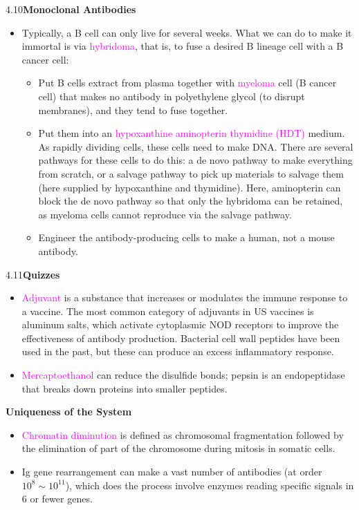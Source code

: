 \documentclass[UTF8]{book}
\newcommand{\pink}[1]{\textcolor{magenta}{#1}}
\begin{document}
4.10\quad \textbf{Monoclonal Antibodies}
\begin{itemize}
\item Typically, a B cell can only live for several weeks. What we can do to make it immortal is via \pink{hybridoma}, that is, to fuse a desired B lineage cell with a B cancer cell:
\begin{itemize}
	\item Put B cells extract from plasma together with \pink{myeloma} cell (B cancer cell) that makes no antibody in polyethylene glycol (to disrupt membranes), and they tend to fuse together.
	\item Put them into an \pink{hypoxanthine aminopterin thymidine (HDT)} medium. As rapidly dividing cells, these cells need to make DNA. There are several pathways for these cells to do this: a de novo pathway to make everything from scratch, or a salvage pathway to pick up materials to salvage them (here supplied by hypoxanthine and thymidine). Here, aminopterin can block the de novo pathway so that only the hybridoma can be retained, as myeloma cells cannot reproduce via the salvage pathway.
	\item Engineer the antibody-producing cells to make a human, not a mouse antibody.
\end{itemize}
\end{itemize}
4.11\quad \textbf{Quizzes}
\begin{itemize}
\item \pink{Adjuvant} is a substance that increases or modulates the immune response to a vaccine. The most common category of adjuvants in US vaccines is aluminum salts, which activate cytoplasmic NOD receptors to improve the effectiveness of antibody production. Bacterial cell wall peptides have been used in the past, but these can produce an excess inflammatory response.
\item \pink{Mercaptoethanol} can reduce the disulfide bonds; pepsin is an endopeptidase that breaks down proteins into smaller peptides.
\end{itemize}
\newpage
{}\quad \textbf{Uniqueness of the System}
\begin{itemize}
\item \pink{Chromatin diminution} is defined as chromosomal fragmentation followed by the elimination of part of the chromosome during mitosis in somatic cells.
\item Ig gene rearrangement can make a vast number of antibodies (at order $10^8\sim 10^{11}$), which does the process involve enzymes reading specific signals in 6 or fewer genes.
\end{itemize}
\end{document}

